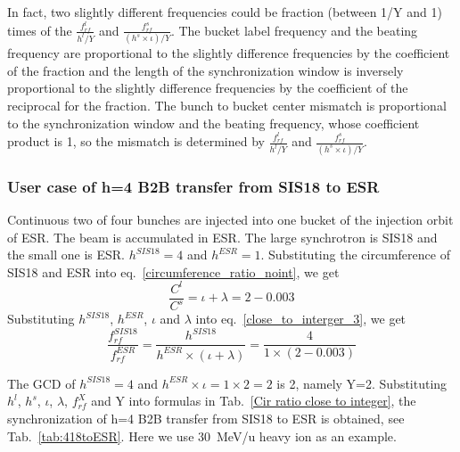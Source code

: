In fact, two slightly different frequencies could be fraction (between 1/Y and 1) times of the $\frac{f_{rf}^{l}}{h^l/Y}$ and $\frac{f_{rf}^{s}}{(h^s\times \iota)/Y}$. The bucket label frequency and the beating frequency are proportional to the slightly difference frequencies by the coefficient of the fraction and the length of the synchronization window is inversely proportional to the slightly difference frequencies by the coefficient of the reciprocal for the fraction. The bunch to bucket center mismatch is proportional to the synchronization window and the beating frequency, whose coefficient product is 1, so the mismatch is determined by $\frac{f_{rf}^{l}}{h^l/Y}$ and $\frac{f_{rf}^{s}}{(h^s\times \iota)/Y}$.

\subsubsection{User case of h=4 B2B transfer from SIS18 to ESR} 
Continuous two of four bunches are injected into one bucket of the injection orbit of ESR. The beam is accumulated in ESR. The large synchrotron is SIS18 and the small one is ESR. $h^{SIS18}=4$ and $h^{ESR}=1$. Substituting the circumference of SIS18 and ESR into eq.~\ref{circumference_ratio_noint}, we get
\begin{equation}
\frac{C^l}{C^s}=\iota + \lambda =2-0.003
\end{equation}
Substituting $h^{SIS18}$, $h^{ESR}$, $\iota$ and $\lambda$ into eq.~\ref{close_to_interger_3}, we get
\begin{equation}
\frac {f_{rf}^{SIS18}}{f_{rf}^{ESR}}= \frac{h^{SIS18}}{h^{ESR} \times (\iota+ \lambda)}=\frac {4}{1 \times(2-0.003)}
\end{equation}

The GCD of $h^{SIS18}=4$ and $h^{ESR}\times \iota=1\times 2=2$ is 2, namely Y=2. Substituting $h^l$, $h^s$, $\iota$, $\lambda$, $f_{rf}^{X}$ and Y into formulas in Tab.~\ref{Cir ratio close to integer}, the synchronization of h=4 B2B transfer from SIS18 to ESR is obtained, see Tab.~\ref{tab:418toESR}. Here we use \SI{30}{MeV/\atomicmassunit} heavy ion as an example. 


